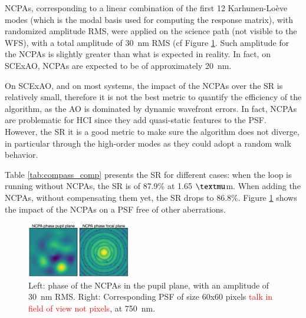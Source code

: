 \documentclass[twocolumn]{aa}
\newcommand{\nour}[1]{\textcolor{teal}{#1}}
\begin{document}

NCPAs, corresponding to a linear combination of the first 12 Karhunen-Loève modes (which is the modal basis used for computing the response matrix), with randomized amplitude RMS, were applied on the science path (not visible to the WFS), with a total amplitude of 30~nm RMS (cf Figure \ref{fig:NCPAs_psf}. Such amplitude for the NCPAs is slightly greater than what is expected in reality. In fact, on SCExAO, NCPAs are expected to be of approximately 20~nm.



On SCExAO, and on most systems, the impact of the NCPAs over the SR is relatively small, therefore it is not the best metric to quantify the efficiency of the algorithm, as the AO is dominated by dynamic wavefront errors. In fact, NCPAs are problematic for HCI since they add quasi-static features to the PSF. However, the SR it is a good metric to make sure the algorithm does not diverge, in particular through the high-order modes as they could adopt a random walk behavior.


Table \ref{tab:compass_comp} presents the SR for different cases: when the loop is running without NCPAs, the SR is of 87.9\% at 1.65 $\textmu$m. When adding the NCPAs, without compensating them yet,  the SR drops to 86.8\%. Figure \ref{fig:NCPAs_psf} shows the impact of the NCPAs on a PSF free of other aberrations. 

\begin{figure}[t]
\begin{center}
\includegraphics[width=0.4\textwidth]{fig/NCPA_compass.png}
\caption{Left: phase of the NCPAs in the pupil plane, with an amplitude of 30~nm RMS. Right: Corresponding PSF of size 60x60 pixels \textcolor{red}{talk in field of view not pixels}, at 750~nm.}
\label{fig:NCPAs_psf}
\end{center}
\end{figure}
\end{document}
